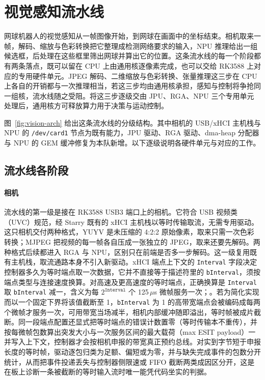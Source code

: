 \section{视觉感知流水线}

网球机器人的视觉感知从一帧图像开始，到网球在画面中的坐标结束。相机取来一帧，解码、缩放与色彩转换把它整理成检测网络要求的输入，NPU 推理给出一组候选框，后处理在这些框里筛出网球并算出它的位置。这条流水线的每一个阶段都有两条落点，既可以留在 CPU 上由通用核逐像素完成，也可以交给 RK3588 上对应的专用硬件单元。JPEG 解码、二维缩放与色彩转换、张量推理这三步在 CPU 上各自的开销都与一次推理相当，若这三步均由通用核承担，感知与控制将争抢同一组核，流水线随之受阻。将这三步逐级交由 JPU、RGA、NPU 三个专用单元处理后，通用核方可释放算力用于决策与运动控制。


图~\ref{fig:vision-arch} 给出这条流水线的分级结构。其中相机的 USB/xHCI 主机栈与 NPU 的 \texttt{/dev/card1} 节点为既有能力，JPU 驱动、RGA 驱动、dma-heap 分配器与 NPU 的 GEM 缓冲修复为本队新增。以下逐级说明各硬件单元与对应的工作。

\subsection{流水线各阶段}

\paragraph{相机}
流水线的第一级是接在 RK3588 USB3 端口上的相机。它符合 USB 视频类（UVC）规范，经 Starry 既有的 xHCI 主机栈以等时传输取流，无需专用驱动。这只相机交付两种格式，YUYV 是未压缩的 4:2:2 原始像素，取来只需一次色彩转换；MJPEG 把视频的每一帧各自压成一张独立的 JPEG，取来还要先解码。两种格式后续都进入 RGA 与 NPU，区别只在前端是否多一步解码。这一级复用既有主机栈，取流通路本身不引入新驱动。xHCI 端点上下文的 \texttt{Interval} 字段决定控制器多久为等时端点取一次数据，它并不直接等于描述符里的 \texttt{bInterval}，须按端点类型与连接速度换算。对高速及更高速度的等时端点，正确换算是 \texttt{Interval} 取 \texttt{bInterval} 减一，含义为每 $2^{\texttt{Interval}}$ 个 125\,$\mu$s 微帧服务一次；。若为简化实现而以一个固定下界将该值截断至 1，\texttt{bInterval} 为 1 的高带宽端点会被编码成每两个微帧才服务一次，可用带宽当场减半，相机内部缓冲随即溢出，等时帧被成片截断。同一段端点配置还显式把等时端点的错误计数置零（等时传输本不重传），并按每微帧包数算出突发大小与一次服务区间的最大载荷（max ESIT payload）一并写入上下文，控制器才会按相机申报的带宽真正预约总线。对实到字节短于申报长度的等时帧，驱动逐包归类为足额、偏短或为零，并与缺失完成事件的包数分开统计，从而把事件投递丢失与控制器侧限速或 FIFO 截断两类成因区分开，这是在板上诊断一条被截断的等时输入流时唯一能凭代码坐实的判据。

